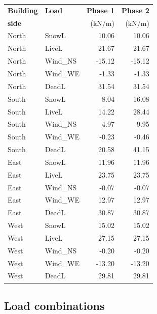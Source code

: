 \begin{center}
  \begin{tabular}{|l|l|r|r|}
\hline
\textbf{Building} & \textbf{Load} & \textbf{Phase 1} & \textbf{Phase 2}\\
\textbf{side} &  & (kN/m) & (kN/m)\\
\hline
North & SnowL & 10.06 & 10.06\\
North & LiveL & 21.67 & 21.67\\
North & Wind\_NS & -15.12 & -15.12\\
North & Wind\_WE & -1.33 & -1.33\\
North & DeadL & 31.54 & 31.54\\
\hline
South & SnowL & 8.04 & 16.08\\
South & LiveL & 14.22 & 28.44\\
South & Wind\_NS & 4.97 & 9.95\\
South & Wind\_WE & -0.23 & -0.46\\
South & DeadL & 20.58 & 41.15\\
\hline
East & SnowL & 11.96 & 11.96\\
East & LiveL & 23.75 & 23.75\\
East & Wind\_NS & -0.07 & -0.07\\
East & Wind\_WE & 12.97 & 12.97\\
East & DeadL & 30.87 & 30.87\\
\hline
West & SnowL & 15.02 & 15.02\\
West & LiveL & 27.15 & 27.15\\
West & Wind\_NS & -0.20 & -0.20\\
West & Wind\_WE & -13.20 & -13.20\\
West & DeadL & 29.81 & 29.81\\
\hline
\end{tabular}
\end{center}

\subsection{Load combinations}

